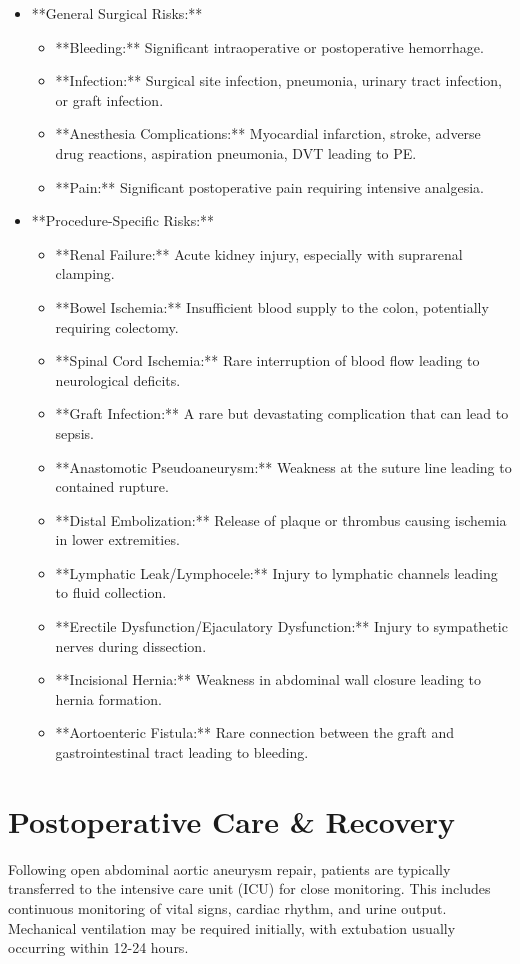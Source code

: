 \begin{itemize}
  \item **General Surgical Risks:**
    \begin{itemize}
      \item **Bleeding:** Significant intraoperative or postoperative hemorrhage.
      \item **Infection:** Surgical site infection, pneumonia, urinary tract infection, or graft infection.
      \item **Anesthesia Complications:** Myocardial infarction, stroke, adverse drug reactions, aspiration pneumonia, DVT leading to PE.
      \item **Pain:** Significant postoperative pain requiring intensive analgesia.
    \end{itemize}
  \item **Procedure-Specific Risks:**
    \begin{itemize}
      \item **Renal Failure:** Acute kidney injury, especially with suprarenal clamping.
      \item **Bowel Ischemia:** Insufficient blood supply to the colon, potentially requiring colectomy.
      \item **Spinal Cord Ischemia:** Rare interruption of blood flow leading to neurological deficits.
      \item **Graft Infection:** A rare but devastating complication that can lead to sepsis.
      \item **Anastomotic Pseudoaneurysm:** Weakness at the suture line leading to contained rupture.
      \item **Distal Embolization:** Release of plaque or thrombus causing ischemia in lower extremities.
      \item **Lymphatic Leak/Lymphocele:** Injury to lymphatic channels leading to fluid collection.
      \item **Erectile Dysfunction/Ejaculatory Dysfunction:** Injury to sympathetic nerves during dissection.
      \item **Incisional Hernia:** Weakness in abdominal wall closure leading to hernia formation.
      \item **Aortoenteric Fistula:** Rare connection between the graft and gastrointestinal tract leading to bleeding.
    \end{itemize}
\end{itemize}

\section*{Postoperative Care \& Recovery}
Following open abdominal aortic aneurysm repair, patients are typically transferred to the intensive care unit (ICU) for close monitoring. This includes continuous monitoring of vital signs, cardiac rhythm, and urine output. Mechanical ventilation may be required initially, with extubation usually occurring within 12-24 hours.

